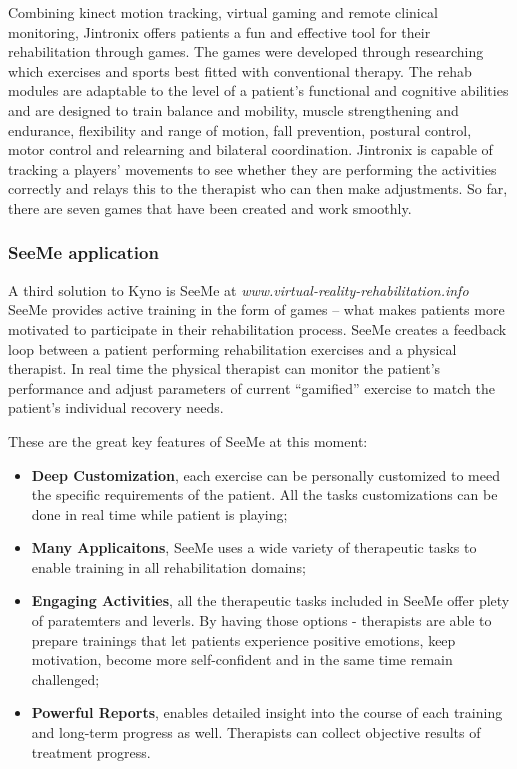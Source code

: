 Combining kinect motion tracking, virtual gaming and remote clinical monitoring, Jintronix offers patients a fun and effective tool for their rehabilitation through games. 
The games were developed through researching which exercises and sports best fitted with conventional therapy. The rehab modules are adaptable to the level of a patient's functional and cognitive abilities and are designed to train balance and mobility, muscle strengthening and endurance, flexibility and range of motion, fall prevention, postural control, motor control and relearning and bilateral coordination. Jintronix is capable of tracking a players’ movements to see whether they are performing the activities correctly and relays this to the therapist who can then make adjustments. So far, there are seven games that have been created and work smoothly.

\subsubsection{SeeMe application}
A third solution to Kyno is  SeeMe at \textit{www.virtual-reality-rehabilitation.info}
SeeMe provides active training in the form of games – what
makes patients more motivated to participate in their
rehabilitation process. SeeMe creates a feedback loop
between a patient performing rehabilitation exercises and
a physical therapist. In real time the physical therapist can
monitor the patient’s performance and adjust
parameters of current “gamified” exercise to match the
patient’s individual recovery needs.

These are the great key features of SeeMe at this moment:
\begin{itemize}
\item \textbf{ Deep Customization}, each exercise can be personally customized to meed the specific requirements of the patient. All the tasks customizations can be done in real time while patient is playing;

\item \textbf{Many Applicaitons}, SeeMe uses a wide variety of therapeutic tasks to enable training in all rehabilitation domains;

\item \textbf{Engaging Activities}, all the therapeutic tasks included in SeeMe offer plety of paratemters and leverls. By having those options - therapists are able to prepare trainings that let patients experience positive emotions, keep motivation, become more self-confident and in the same time remain challenged;

\item \textbf{Powerful Reports}, enables detailed insight into the course of each training and long-term progress as well. Therapists can collect objective results of treatment progress.


\end{itemize}

